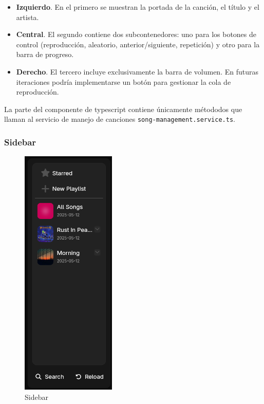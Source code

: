 \documentclass[11pt, a4paper]{article}
\begin{document}
            \begin{itemize}
                \item \textbf{Izquierdo}. En el primero se muestran la portada de la canción, el título y el artista.
                \item \textbf{Central}. El segundo contiene dos subcontenedores: uno para los botones de control (reproducción, aleatorio, anterior/siguiente, repetición) y otro para la barra de progreso.
                \item \textbf{Derecho}. El tercero incluye exclusivamente la barra de volumen. En futuras iteraciones podría implementarse un botón para gestionar la cola de reproducción.
            \end{itemize}

            La parte del componente de typescript contiene únicamente métododos que llaman al servicio de manejo de canciones \texttt{song-management.service.ts}.

            \subsubsection{Sidebar}

            \begin{figure}[H]
                \centering
                \includegraphics[width=0.4\textwidth]{media/screenshots/sidebar.png}
                \caption{Sidebar}
                \label{fig:sidebar}
            \end{figure}
\end{document}
